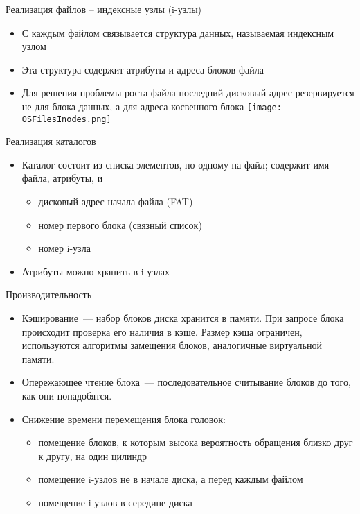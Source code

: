 \documentclass[aspectratio=169,14pt]{beamer}
\begin{document}
\begin{frame}{Реализация файлов – индексные узлы (i-узлы)}
    \begin{footnotesize}
        \begin{itemize}
            \item С каждым файлом связывается структура данных, называемая
            индексным узлом
            \item Эта структура содержит атрибуты и адреса блоков файла
            \item Для решения проблемы роста файла последний дисковый адрес
            резервируется не для блока данных, а для адреса косвенного блока
            \texttt{[image: OSFilesInodes.png]}
        \end{itemize}
    \end{footnotesize}
\end{frame}

\begin{frame}{Реализация каталогов}
    \begin{itemize}
        \item Каталог состоит из списка элементов, по одному на файл;
        содержит имя файла, атрибуты, и
        \begin{itemize}
            \item дисковый адрес начала файла (FAT)
            \item номер первого блока (связный список)
            \item номер i-узла
        \end{itemize}
        \item Атрибуты можно хранить в i-узлах
    \end{itemize}
\end{frame}

\begin{frame}{Производительность}
    \begin{itemize}
        \item Кэширование~--- набор блоков диска хранится в памяти. При
        запросе блока происходит проверка его наличия в кэше. Размер кэша
        ограничен, используются алгоритмы замещения блоков, аналогичные
        виртуальной памяти.
        \item Опережающее чтение блока~--- последовательное считывание блоков
        до того, как они понадобятся.
        \item Снижение времени перемещения блока головок:
        \begin{itemize}
            \item помещение блоков, к которым высока вероятность обращения
            близко друг к другу, на один цилиндр
            \item помещение i-узлов не в начале диска, а перед каждым файлом
            \item помещение i-узлов в середине диска
        \end{itemize}
    \end{itemize}
\end{frame}
\end{document}
